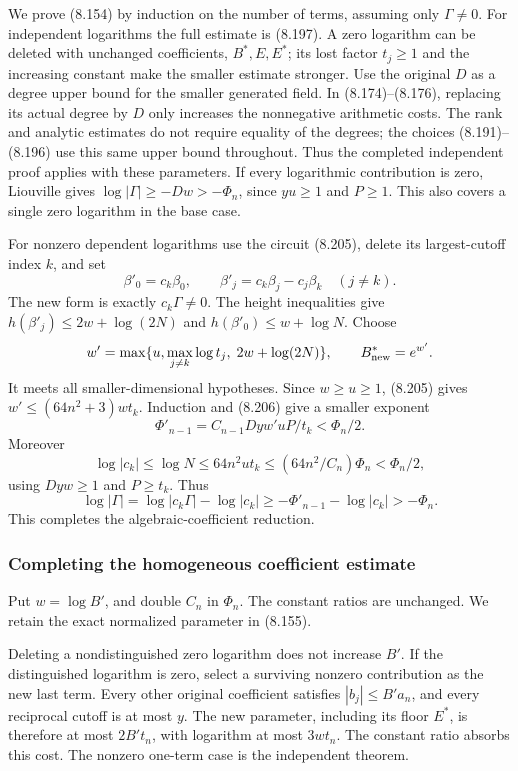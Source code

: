 \documentclass[
  11pt,
  a4paper,
]{article}
\begin{document}
We prove (8.154) by induction on the number of terms, assuming only
\(\Gamma\ne0\). For independent logarithms the full estimate is (8.197).
A zero logarithm can be deleted with unchanged coefficients,
\(B^*,E,E^*\); its lost factor \(t_j\ge1\) and the increasing constant
make the smaller estimate stronger. Use the original \(D\) as a degree
upper bound for the smaller generated field. In (8.174)--(8.176),
replacing its actual degree by \(D\) only increases the nonnegative
arithmetic costs. The rank and analytic estimates do not require
equality of the degrees; the choices (8.191)--(8.196) use this same
upper bound throughout. Thus the completed independent proof applies
with these parameters. If every logarithmic contribution is zero,
Liouville gives \(\log|\Gamma|\ge-Dw>-\Phi_n\), since \(yu\ge1\) and
\(P\ge1\). This also covers a single zero logarithm in the base case.

For nonzero dependent logarithms use the circuit (8.205), delete its
largest-cutoff index \(k\), and set \[
\beta'_0=c_k\beta_0,\qquad
\beta'_j=c_k\beta_j-c_j\beta_k\quad(j\ne k).
\] The new form is exactly \(c_k\Gamma\ne0\). The height inequalities
give \(h(\beta'_j)\le2w+\log(2N)\) and \(h(\beta'_0)\le w+\log N\).
Choose \[
w'=\max\{u,\max_{j\ne k}\log t_j,\;2w+\log(2N)\},
\qquad B_{\rm new}^*=e^{w'}.
\] It meets all smaller-dimensional hypotheses. Since \(w\ge u\ge1\),
(8.205) gives \(w'\le(64n^2+3)w t_k\). Induction and (8.206) give a
smaller exponent \[
\Phi'_{n-1}=C_{n-1}D y w'uP/t_k<\Phi_n/2.
\] Moreover \[
\log|c_k|\le\log N\le64n^2u t_k
\le(64n^2/C_n)\Phi_n<\Phi_n/2,
\] using \(D y w\ge1\) and \(P\ge t_k\). Thus \[
\log|\Gamma|
=\log|c_k\Gamma|-\log|c_k|
\ge-\Phi'_{n-1}-\log|c_k|>-\Phi_n.
\tag{8.207}
\] This completes the algebraic-coefficient reduction.

\subsubsection{Completing the homogeneous coefficient
estimate}\label{completing-the-homogeneous-coefficient-estimate}

Put \(w=\log B'\), and double \(C_n\) in \(\Phi_n\). The constant ratios
are unchanged. We retain the exact normalized parameter in (8.155).

Deleting a nondistinguished zero logarithm does not increase \(B'\). If
the distinguished logarithm is zero, select a surviving nonzero
contribution as the new last term. Every other original coefficient
satisfies \(|b_j|\le B'a_n\), and every reciprocal cutoff is at most
\(y\). The new parameter, including its floor \(E^*\), is therefore at
most \(2B't_n\), with logarithm at most \(3w t_n\). The constant ratio
absorbs this cost. The nonzero one-term case is the independent theorem.
\end{document}

